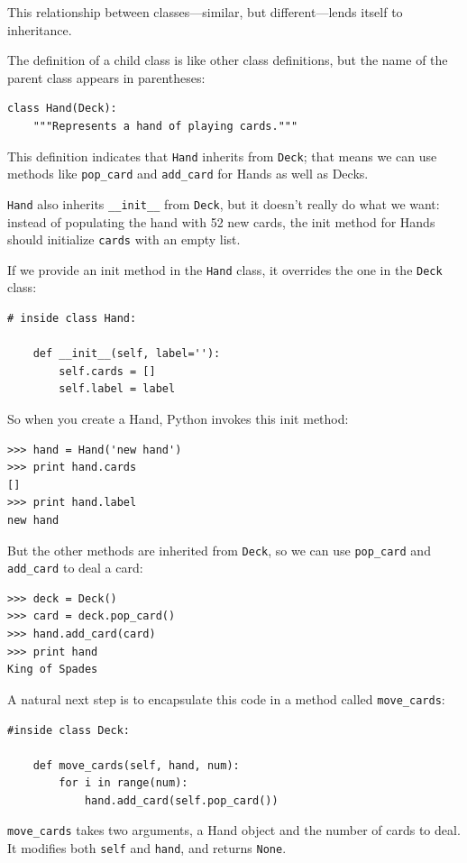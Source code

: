 \documentclass[10pt]{book}
\begin{document}
This relationship between classes---similar, but different---lends
itself to inheritance.  

The definition of a child class is like other class definitions,
but the name of the parent class appears in parentheses:

\begin{verbatim}
class Hand(Deck):
    """Represents a hand of playing cards."""
\end{verbatim}
%
This definition indicates that {\tt Hand} inherits from {\tt Deck};
that means we can use methods like \verb"pop_card" and \verb"add_card"
for Hands as well as Decks.

{\tt Hand} also inherits \verb"__init__" from {\tt Deck}, but
it doesn't really do what we want: instead of populating the hand
with 52 new cards, the init method for Hands should initialize
{\tt cards} with an empty list.

If we provide an init method in the {\tt Hand} class, it overrides the
one in the {\tt Deck} class:

\begin{verbatim}
# inside class Hand:

    def __init__(self, label=''):
        self.cards = []
        self.label = label
\end{verbatim}
%
So when you create a Hand, Python invokes this init method:

\begin{verbatim}
>>> hand = Hand('new hand')
>>> print hand.cards
[]
>>> print hand.label
new hand
\end{verbatim}
%
But the other methods are inherited from {\tt Deck}, so we can use
\verb"pop_card" and \verb"add_card" to deal a card:

\begin{verbatim}
>>> deck = Deck()
>>> card = deck.pop_card()
>>> hand.add_card(card)
>>> print hand
King of Spades
\end{verbatim}
%
A natural next step is to encapsulate this code in a method
called \verb"move_cards":

\begin{verbatim}
#inside class Deck:

    def move_cards(self, hand, num):
        for i in range(num):
            hand.add_card(self.pop_card())
\end{verbatim}
%
\verb"move_cards" takes two arguments, a Hand object and the number of
cards to deal.  It modifies both {\tt self} and {\tt hand}, and
returns {\tt None}.
\end{document}
